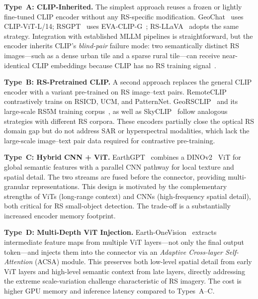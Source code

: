 \textbf{Type~A: CLIP-Inherited.}
The simplest approach reuses a frozen or lightly fine-tuned CLIP encoder without any
RS-specific modification. GeoChat~\cite{geochat2024} uses CLIP-ViT-L/14; RSGPT~\cite{rsgpt2023}
uses EVA-CLIP-G~\cite{fang2023evaclip}; RS-LLaVA~\cite{rsllava2024} adopts the same strategy. Integration with
established MLLM pipelines is straightforward, but the encoder inherits CLIP's
\emph{blind-pair} failure mode: two semantically distinct RS images---such as a dense
urban tile and a sparse rural tile---can receive near-identical CLIP embeddings
because CLIP has no RS training signal~\cite{bommasani2021}.

\textbf{Type~B: RS-Pretrained CLIP.}
A second approach replaces the general CLIP encoder with a variant pre-trained on RS
image--text pairs. RemoteCLIP~\cite{remoteclip2024} contrastively trains on RSICD, UCM,
and PatternNet. GeoRSCLIP~\cite{georscclip2024} and its large-scale RS5M training corpus~\cite{lin2024rs5m}, as well as SkyCLIP~\cite{skyclip2024} follow
analogous strategies with different RS corpora. These encoders partially close the
optical RS domain gap but do not address SAR or hyperspectral modalities, which lack
the large-scale image--text pair data required for contrastive pre-training.

\textbf{Type~C: Hybrid CNN + ViT.}
EarthGPT~\cite{earthgpt2025} combines a DINOv2~\cite{oquab2023dinov2} ViT for global semantic features with a
parallel CNN pathway for local texture and spatial detail. The two streams are fused
before the connector, providing multi-granular representations. This design is motivated
by the complementary strengths of ViTs (long-range context) and CNNs (high-frequency
spatial detail), both critical for RS small-object detection. The trade-off is a
substantially increased encoder memory footprint.

\textbf{Type~D: Multi-Depth ViT Injection.}
Earth-OneVision~\cite{earthonevision2026} extracts intermediate feature maps from
multiple ViT layers---not only the final output token---and injects them into the
connector via an \emph{Adaptive Cross-layer Self-Attention} (ACSA) module. This
preserves both low-level spatial detail from early ViT layers and high-level semantic
context from late layers, directly addressing the extreme scale-variation challenge
characteristic of RS imagery. The cost is higher GPU memory and inference latency
compared to Types~A--C.

